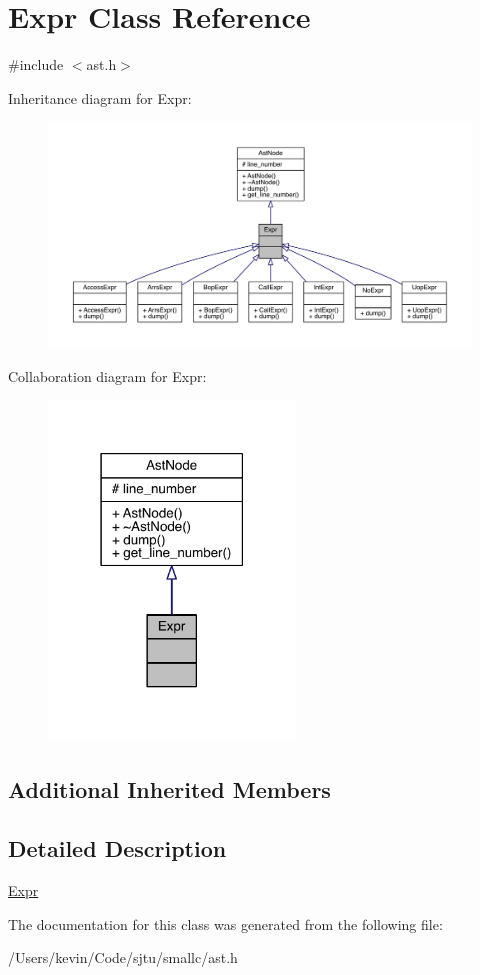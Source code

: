 \hypertarget{class_expr}{}\section{Expr Class Reference}
\label{class_expr}


{\ttfamily \#include $<$ast.\+h$>$}



Inheritance diagram for Expr\+:\nopagebreak
\begin{figure}[H]
\begin{center}
\leavevmode
\includegraphics[width=350pt]{class_expr__inherit__graph}
\end{center}
\end{figure}


Collaboration diagram for Expr\+:\nopagebreak
\begin{figure}[H]
\begin{center}
\leavevmode
\includegraphics[width=186pt]{class_expr__coll__graph}
\end{center}
\end{figure}
\subsection*{Additional Inherited Members}


\subsection{Detailed Description}
\hyperlink{class_expr}{Expr} 

The documentation for this class was generated from the following file\+:\begin{DoxyCompactItemize}
\item 
/\+Users/kevin/\+Code/sjtu/smallc/ast.\+h\end{DoxyCompactItemize}
